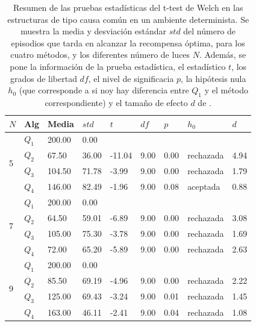 \begin{table}[]
\centering
\caption{\footnotesize{Resumen de las pruebas estadísticas del t-test de Welch en las
estructuras de tipo causa común en un ambiente determinista. Se muestra la media y desviación estándar $std$ del número 
de episodios que tarda en alcanzar la recompensa óptima, para los cuatro métodos, y los diferentes número de luces $N$. Además, se pone la información
de la prueba estadística, el estadístico $t$, los grados de libertad $df$, el nivel
de significacia $p$, la hipótesis nula $h_0$ (que corresponde a si noy hay diferencia entre $Q_1$ y el método correspondiente) y el tamaño de efecto $d$ de \citet{cohen2013statistical}.}}
\label{tab:dqn-common-cause-det}
\begin{tabular}{|l|l|l|l|l|l|l|l|l|}
\hline
$N$ & Alg & Media & $std$ & $t$ & $df$ & $p$ & $h_0$ & $d$ \\ \hline
\multirow{4}{*}{5} & $Q_1$ & 200.00 & 0.00 & \multicolumn{5}{l|}{} \\ \cline{2-9} 
 & $Q_2$ & 67.50 & 36.00 & -11.04 & 9.00 & 0.00 & rechazada & 4.94 \\ \cline{2-9} 
 & $Q_3$ & 104.50 & 71.78 & -3.99 & 9.00 & 0.00 & rechazada & 1.79 \\ \cline{2-9} 
 & $Q_4$ & 146.00 & 82.49 & -1.96 & 9.00 & 0.08 & aceptada & 0.88 \\ \hline
\multirow{4}{*}{7} & $Q_1$ & 200.00 & 0.00 & \multicolumn{5}{l|}{} \\ \cline{2-9} 
 & $Q_2$ & 64.50 & 59.01 & -6.89 & 9.00 & 0.00 & rechazada & 3.08 \\ \cline{2-9} 
 & $Q_3$ & 105.00 & 75.30 & -3.78 & 9.00 & 0.00 & rechazada & 1.69 \\ \cline{2-9} 
 & $Q_4$ & 72.00 & 65.20 & -5.89 & 9.00 & 0.00 & rechazada & 2.63 \\ \hline
\multirow{4}{*}{9} & $Q_1$ & 200.00 & 0.00 & \multicolumn{5}{l|}{} \\ \cline{2-9} 
 & $Q_2$ & 85.50 & 69.19 & -4.96 & 9.00 & 0.00 & rechazada & 2.22 \\ \cline{2-9} 
 & $Q_3$ & 125.00 & 69.43 & -3.24 & 9.00 & 0.01 & rechazada & 1.45 \\ \cline{2-9} 
 & $Q_4$ & 163.00 & 46.11 & -2.41 & 9.00 & 0.04 & rechazada & 1.08 \\ \hline
\end{tabular}
\end{table}

